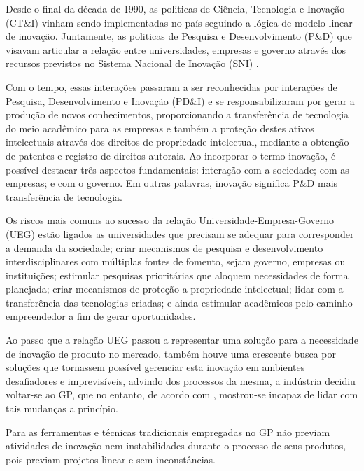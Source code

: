 Desde o final da década de 1990, as politicas de Ciência, Tecnologia e Inovação (CT\&I) vinham sendo implementadas no país seguindo a lógica de modelo linear de inovação. Juntamente, as politicas de Pesquisa e Desenvolvimento (P\&D) que visavam articular a relação entre universidades, empresas e governo através dos recursos previstos no Sistema Nacional de Inovação (SNI) \cite{kuhlmann112008logicas}.

Com o tempo, essas interações passaram a ser reconhecidas por interações de Pesquisa, Desenvolvimento e Inovação (PD\&I) e se responsabilizaram por gerar a produção de novos conhecimentos, proporcionando a transferência de tecnologia do meio acadêmico para as empresas e também a proteção destes ativos intelectuais através dos direitos de propriedade intelectual, mediante a obtenção de patentes e registro de direitos autorais. Ao incorporar o termo inovação, é possível destacar três aspectos fundamentais: interação com a sociedade; com as empresas; e com o governo. Em outras palavras, inovação significa P\&D mais transferência de tecnologia.

Os riscos mais comuns ao sucesso da relação Universidade-Empresa-Governo (UEG) estão ligados as universidades que precisam se adequar para corresponder a demanda da sociedade; criar mecanismos de pesquisa e desenvolvimento interdisciplinares com múltiplas fontes de fomento, sejam governo, empresas ou instituições; estimular pesquisas prioritárias que aloquem necessidades de forma planejada; criar mecanismos de proteção a propriedade intelectual; lidar com a transferência das tecnologias criadas; e ainda estimular acadêmicos pelo caminho empreendedor a fim de gerar oportunidades.

Ao passo que a relação UEG passou a representar uma solução para a necessidade de inovação de produto no mercado, também houve uma crescente busca por soluções que tornassem possível gerenciar esta inovação em ambientes desafiadores e imprevisíveis, advindo dos processos da mesma, a indústria decidiu voltar-se ao GP, que no entanto, de acordo com , mostrou-se incapaz de lidar com tais mudanças a princípio.

Para  as ferramentas e técnicas tradicionais empregadas no GP não previam atividades de inovação nem instabilidades durante o processo de seus produtos, pois previam projetos linear e sem inconstâncias.

